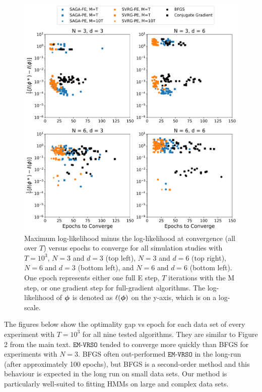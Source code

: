 \documentclass[12pt]{article}
\begin{document}
\begin{figure}[H]
    \centering
    \includegraphics[width=6.5in]{../plt/scatter_sim_T_1000.png}
    \caption{Maximum log-likelihood minus the log-likelihood at convergence (all over $T$) versus epochs to converge for all simulation studies with $T=10^{3}$, $N=3$ and $d=3$ (top left), $N=3$ and $d=6$ (top right), $N=6$ and $d=3$ (bottom left), and $N=6$ and $d=6$ (bottom left). One epoch represents either one full E step, $T$ iterations with the M step, or one gradient step for full-gradient algorithms. The log-likelihood of $\boldsymbol{\phi}$ is denoted as $\ell(\boldsymbol{\phi})$ on the y-axis, which is on a log-scale.}
    \label{fig:scatter_sim}
\end{figure}


\newpage 

The figures below show the optimality gap vs epoch for each data set of every experiment with $T=10^{3}$ for all nine tested algorithms. They are similar to Figure 2 from the main text. $\texttt{EM-VRSO}$ tended to converge more quickly than BFGS for experiments with $N=3$. BFGS often out-performed $\texttt{EM-VRSO}$ in the long-run (after approximately 100 epochs), but BFGS is a second-order method and this behaviour is expected in the long run on small data sets. Our method is particularly well-suited to fitting HMMs on large and complex data sets. 
\end{document}

